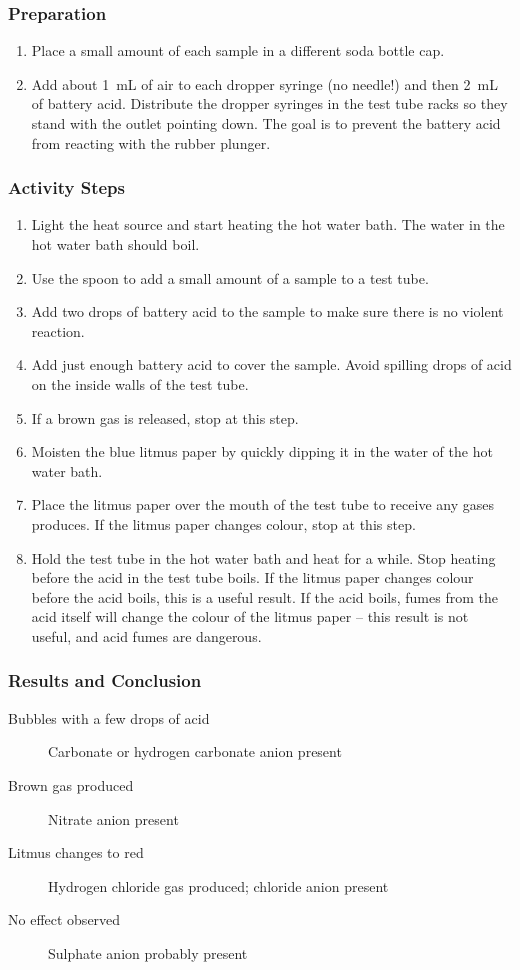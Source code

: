 \subsubsection{Preparation}
\begin{enumerate}
\item{Place a small amount of each sample in a different soda bottle cap.}
\item{Add about 1~mL of air to each dropper syringe (no needle!) and then 2~mL of battery acid. Distribute the dropper syringes in the test tube racks so they stand with the outlet pointing down. The goal is to prevent the battery acid from reacting with the rubber plunger.}
\end{enumerate}

\subsubsection{Activity Steps}
\begin{enumerate}
\item{Light the heat source and start heating the hot water bath. The water in the hot water bath should boil.}
\item{Use the spoon to add a small amount of a sample to a test tube.}
\item{Add two drops of battery acid to the sample to make sure there is no violent reaction.}
\item{Add just enough battery acid to cover the sample. Avoid spilling drops of acid on the inside walls of the test tube.}
\item{If a brown gas is released, stop at this step.}
\item{Moisten the blue litmus paper by quickly dipping it in the water of the hot water bath.}
\item{Place the litmus paper over the mouth of the test tube to receive any gases produces. If the litmus paper changes colour, stop at this step.}
\item{Hold the test tube in the hot water bath and heat for a while. Stop heating before the acid in the test tube boils. If the litmus paper changes colour before the acid boils, this is a useful result. If the acid boils, fumes from the acid itself will change the colour of the litmus paper -- this result is not useful, and acid fumes are dangerous.}
\end{enumerate}

\subsubsection{Results and Conclusion}
\begin{description}
\item[Bubbles with a few drops of acid]{Carbonate or hydrogen carbonate anion  present}
\item[Brown gas produced]{Nitrate anion present}
\item[Litmus changes to red]{Hydrogen chloride gas produced; chloride anion present}
\item[No effect observed]{Sulphate anion probably present}
\end{description}

